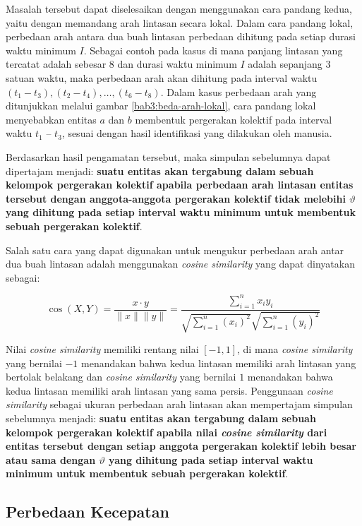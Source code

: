 Masalah tersebut dapat diselesaikan dengan menggunakan cara pandang kedua, yaitu dengan memandang arah lintasan secara lokal. Dalam cara pandang lokal, perbedaan arah antara dua buah lintasan perbedaan dihitung pada setiap durasi waktu minimum $I$. Sebagai contoh pada kasus di mana panjang lintasan yang tercatat adalah sebesar $8$ dan durasi waktu minimum $I$ adalah sepanjang $3$ satuan waktu, maka perbedaan arah akan dihitung pada interval waktu $(t_1 - t_3), (t_2 - t_4), \ldots, (t_6 - t_8)$. Dalam kasus perbedaan arah yang ditunjukkan melalui gambar \ref{bab3:beda-arah-lokal}, cara pandang lokal menyebabkan entitas $a$ dan $b$ membentuk pergerakan kolektif pada interval waktu $t_1$ -- $t_3$, sesuai dengan hasil identifikasi yang dilakukan oleh manusia.

Berdasarkan hasil pengamatan tersebut, maka simpulan sebelumnya dapat dipertajam menjadi: \textbf{suatu entitas akan tergabung dalam sebuah kelompok pergerakan kolektif apabila perbedaan arah lintasan entitas tersebut dengan anggota-anggota pergerakan kolektif tidak melebihi $\vartheta$ yang dihitung pada setiap interval waktu minimum untuk membentuk sebuah pergerakan kolektif}.

Salah satu cara yang dapat digunakan untuk mengukur perbedaan arah antar dua buah lintasan adalah menggunakan \textit{cosine similarity} yang dapat dinyatakan sebagai:

\begin{equation}
    \cos (X, Y)= \frac{x \cdot y}{\|x\| \|y\|} = \frac{ \sum_{i=1}^{n}{x_i y_i}}{ \sqrt{\sum_{i=1}^{n}{(x_i)^2}} \sqrt{\sum_{i=1}^{n}{( y_i)^2}} }
    \label{bab3:cosine-similarity}
\end{equation}

Nilai \textit{cosine similarity} memiliki rentang nilai $[-1, 1]$, di mana \textit{cosine similarity} yang bernilai $-1$ menandakan bahwa kedua lintasan memiliki arah lintasan yang bertolak belakang dan \textit{cosine similarity} yang bernilai $1$ menandakan bahwa kedua lintasan memiliki arah lintasan yang sama persis. Penggunaan \textit{cosine similarity} sebagai ukuran perbedaan arah lintasan akan mempertajam simpulan sebelumnya menjadi: \textbf{suatu entitas akan tergabung dalam sebuah kelompok pergerakan kolektif apabila nilai \textit{cosine similarity} dari entitas tersebut dengan setiap anggota pergerakan kolektif lebih besar atau sama dengan $\vartheta$ yang dihitung pada setiap interval waktu minimum untuk membentuk sebuah pergerakan kolektif}.
    
\subsection{Perbedaan Kecepatan}
\label{subsec:beda-kecepatan}
    

